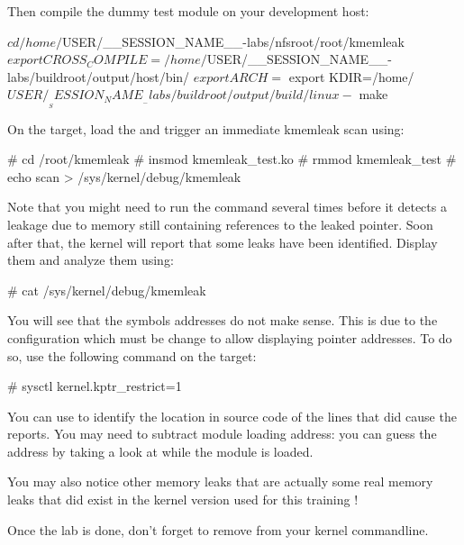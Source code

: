 Then compile the dummy test module on your development host:

\begin{bashinput}
$ cd /home/$USER/__SESSION_NAME__-labs/nfsroot/root/kmemleak
$ export CROSS_COMPILE=/home/$USER/__SESSION_NAME__-labs/buildroot/output/host/bin/%
$ export ARCH=%
$ export KDIR=/home/$USER/__SESSION_NAME__-labs/buildroot/output/build/linux-%
$ make
\end{bashinput}

On the target, load the  and trigger an immediate
kmemleak scan using:

\begin{bashinput}
# cd /root/kmemleak
# insmod kmemleak_test.ko
# rmmod kmemleak_test
# echo scan > /sys/kernel/debug/kmemleak
\end{bashinput}

Note that you might need to run the  command several times
before it detects a leakage due to memory still containing references to
the leaked pointer. Soon after that, the kernel will report that some leaks
have been identified. Display them and analyze them using:

\begin{bashinput}
# cat /sys/kernel/debug/kmemleak
\end{bashinput}

You will see that the symbols addresses do not make sense. This is due to the
 configuration which must be change to allow displaying
pointer addresses. To do so, use the following command on the target:

\begin{bashinput}
# sysctl kernel.kptr_restrict=1
\end{bashinput}

You can use  to identify the location in source code of the
lines that did cause the reports. You may need to subtract module loading address:
you can guess the address by taking a look at  while the module
is loaded.

You may also notice other memory leaks that are actually some real memory leaks
that did exist in the kernel version used for this training !

Once the lab is done, don't forget to remove  from your
kernel commandline.

